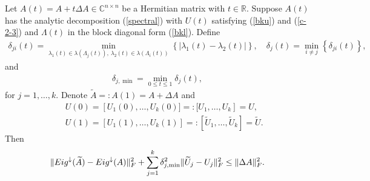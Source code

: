 \documentclass[10pt,a4paper]{amsart}
\newcommand {\diag}  {\mathop{\rm diag}\nolimits}
\newcommand {\wt} {\widetilde}
\begin{document}
\begin{Theorem}\label{them1}
Let $A(t)=A+t\Delta A\in\mathbb{C}^{n\times n}$ be a Hermitian matrix with $t\in{\mathbb R}$.
Suppose $A(t)$ has the analytic decomposition (\ref{spectral}) with $U(t)$ satisfying
(\ref{bku}) and (\ref{c-2-3}) and $\Lambda(t)$ in the block diagonal form (\ref{bkl}).
Define
\begin{eqnarray}\label{c-2-1}
\delta_{ji}(t)=\min_{\lambda_1(t)\in\lambda(\Lambda_j(t)),~
\lambda_2(t)\in\lambda(\Lambda_i(t))}\left\{\left|\lambda_1(t)-\lambda_2(t)\right|\right\},\quad
\delta_j(t)=\min_{i\ne j}\left\{\delta_{ji}(t)\right\},
\end{eqnarray}
and
\begin{eqnarray}\label{c-2-2}
\delta_{j,\min}=\min_{0\le t\le 1}\delta_j(t),
\end{eqnarray}
for $j=1,\ldots,k$. Denote $\wt A=: A(1)=A+\Delta A$ and
\begin{eqnarray*}
&&U(0)=\left[U_1(0),\ldots, U_k(0)]=:[U_1, \ldots, U_k\right]=U,\\
&&U(1)=\left[U_1(1),\ldots, U_k(1)\right]=:[\wt U_1,\ldots, \wt U_k ]=\wt U. %
\end{eqnarray*}
Then
\begin{eqnarray}\label{c-2-4}
\|{\rm Eig}^{\downarrow}(\wt A)-{\rm Eig}^{\downarrow}(A)\|_F^2+\sum_{j=1}^k
\delta_{j,\min}^2\|\wt U_j-U_j\|_F^2\le
\|{\Delta A}\|_F^2.
\end{eqnarray}
\end{Theorem}\vskip 2mm
\end{document}
